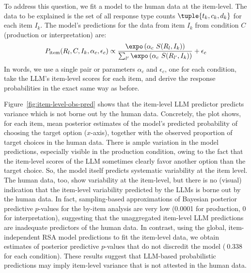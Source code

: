 \documentclass{article}
\begin{document}
To address this question, we fit a model to the human data at the item-level.
The data to be explained is the set of all response type counts $\tuple{t_{k}, c_{k}, d_{k}}$ for each item $I_{k}$.
The model's predictions for the data from item $I_{k}$ from condition $C$ (production or interpretation) are:
%
\begin{align*}
  P_{\text{item}}(R_{l}, C, I_{k}, \alpha_{c}, \epsilon_{c}) \propto \frac{\expo \left( \alpha_{c} \ S(R_{l}, I_{k}) \right )}{ \sum_{l'} \expo \left( \alpha_{c} \ S(R_{l'}, I_{k}) \right )} + \epsilon_{c}
\end{align*}
%
In words, we use a single pair or parameters $\alpha_{c}$ and $\epsilon_{c}$, one for each condition, take the LLM's item-level scores for each item, and derive the response probabilities in the exact same way as before.

Figure~\ref{fig:item-level-obs-pred} shows that the item-level LLM predictor predicts variance which is not borne out by the human data.
Concretely, the plot shows, for each item, mean posterior estimates of the model's predicted probability of choosing the target option ($x$-axis), together with the observed proportion of target choices in the human data.
There is ample variation in the model predictions, especially visible in the production condition, owing to the fact that the item-level scores of the LLM sometimes clearly favor another option than the target choice.
So, the model itself predicts systematic variability at the item level.
The human data, too, show variability at the item-level, but there is no (visual) indication that the item-level variability predicted by the LLMs is borne out by the human data.
In fact, sampling-based approximations of Bayesian posterior predictive $p$-values for the by-item analysis are very low (0.0001 for production, 0 for interpretation), suggesting that the unaggregated item-level LLM predictions are inadequate predictors of the human data.
In contrast, using the global, item-independent RSA model predictions to fit the item-level data, we obtain estimates of posterior predictive $p$-values that do not discredit the model ($~0.338$ for each condition).
These results suggest that LLM-based probabilistic predictions may imply item-level variance that is not attested in the human data.
\end{document}
